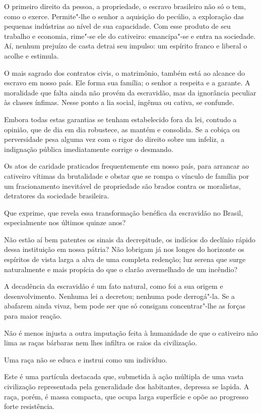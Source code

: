 \begin{linenumbers}
O primeiro direito da pessoa, a propriedade, o escravo brasileiro não só
o tem, como o exerce. Permite"-lhe o senhor a aquisição do pecúlio, a
exploração das pequenas indústrias ao nível de sua capacidade. Com esse
produto de seu trabalho e economia, rime"-se ele do cativeiro:
emancipa"-se e entra na sociedade. Aí, nenhum prejuízo de casta detrai
seu impulso: um espírito franco e liberal o acolhe e estimula.

O mais sagrado dos contratos civis, o matrimônio, também está ao alcance
do escravo em nosso país. Ele forma sua família; o senhor a respeita e
a garante. A moralidade que falta ainda não provém da escravidão, mas
da ignorância peculiar às classes ínfimas. Nesse ponto a lia social,
ingênua ou cativa, se confunde.

Embora todas estas garantias se tenham estabelecido fora da lei, contudo
a opinião, que de dia em dia robustece, as mantém e consolida. Se a
cobiça ou perversidade pesa alguma vez com o rigor do direito sobre um
infeliz, a indignação pública imediatamente corrige o desmando. 

Os atos de caridade praticados frequentemente em nosso país, para
arrancar ao cativeiro vítimas da brutalidade e obstar que se rompa o
vínculo de família por um fracionamento inevitável de propriedade são
brados contra os moralistas, detratores da sociedade brasileira.

Que exprime, que revela essa transformação benéfica da escravidão no
Brasil, especialmente nos últimos quinze anos?

Não estão aí bem patentes os sinais da decrepitude, os indícios do
declínio rápido dessa instituição em nossa pátria? Não lobrigam já nos
longes do horizonte os espíritos de vista larga a alva de uma completa
redenção; luz serena que surge naturalmente e mais propícia do que o
clarão avermelhado de um incêndio? 

A decadência da escravidão é um fato natural, como foi a sua origem e
desenvolvimento. Nenhuma lei a decretou; nenhuma pode derrogá"-la. Se
a abafarem ainda vivaz, bem pode ser que só consigam concentrar"-lhe
as forças para maior reação. 

Não é menos injusta a outra imputação feita à humanidade de que o
cativeiro não lima as raças bárbaras nem lhes infiltra os raios da civilização. 

Uma raça não se educa e instrui como um indivíduo. 

Este é uma partícula destacada que, submetida à ação múltipla de uma
vasta civilização representada pela generalidade dos habitantes,
depressa se lapida. A raça, porém, é massa compacta, que ocupa larga
superfície e opõe ao progresso forte resistência.


\end{linenumbers}
